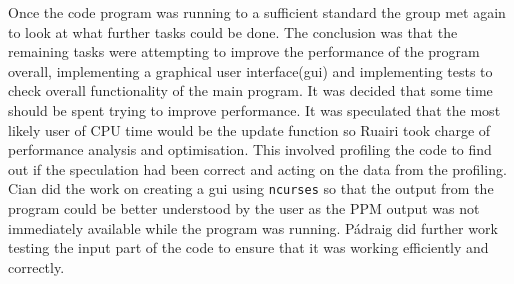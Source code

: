 Once the code program was running to a sufficient standard the group met again to look at what further tasks could be done.
The conclusion was that the remaining tasks were attempting to improve the performance of the program overall, implementing a graphical user interface(gui) and implementing tests to check overall functionality of the main program.
It was decided that some time should be spent trying to improve performance.
It was speculated that the most likely user of CPU time would be the update function so Ruairi took charge of performance analysis and optimisation.
This involved profiling the code to find out if the speculation had been correct and acting on the data from the profiling.
Cian did the work on creating a gui using \texttt{ncurses} so that the output from the program could be better understood by the user as the PPM output was not immediately available while the program was running.
P\'{a}draig did further work testing the input part of the code to ensure that it was working efficiently and correctly.

